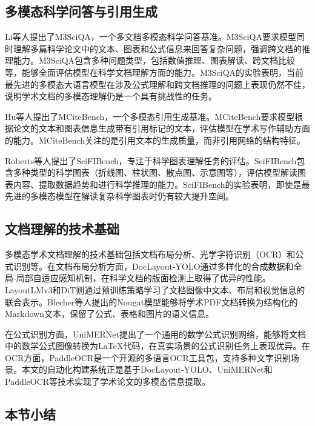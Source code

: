 \subsection{多模态科学问答与引用生成}

Li等人\cite{li2024m3sciqa}提出了M3SciQA，一个多文档多模态科学问答基准。M3SciQA要求模型同时理解多篇科学论文中的文本、图表和公式信息来回答复杂问题，强调跨文档的推理能力。M3SciQA包含多种问题类型，包括数值推理、图表解读、跨文档比较等，能够全面评估模型在科学文档理解方面的能力。M3SciQA的实验表明，当前最先进的多模态大语言模型在涉及公式理解和跨文档推理的问题上表现仍然不佳，说明学术文档的多模态理解仍是一个具有挑战性的任务。

Hu等人\cite{hu2025mcitebench}提出了MCiteBench，一个多模态引用生成基准。MCiteBench要求模型根据论文的文本和图表信息生成带有引用标记的文本，评估模型在学术写作辅助方面的能力。MCiteBench关注的是引用文本的生成质量，而非引用网络的结构特征。

Roberts等人\cite{roberts2024scifibench}提出了SciFIBench，专注于科学图表理解任务的评估。SciFIBench包含多种类型的科学图表（折线图、柱状图、散点图、示意图等），评估模型解读图表内容、提取数据趋势和进行科学推理的能力。SciFIBench的实验表明，即使是最先进的多模态模型在解读复杂科学图表时仍有较大提升空间。

\subsection{文档理解的技术基础}

多模态学术文档理解的技术基础包括文档布局分析、光学字符识别（OCR）和公式识别等。在文档布局分析方面，DocLayout-YOLO\cite{zhao2024doclayoutyolo}通过多样化的合成数据和全局-局部自适应感知机制，在科学文档的版面检测上取得了优异的性能。LayoutLMv3\cite{huang2022layoutlmv3}和DiT\cite{li2022dit}则通过预训练策略学习了文档图像中文本、布局和视觉信息的联合表示。Blecher等人\cite{blecher2024nougat}提出的Nougat模型能够将学术PDF文档转换为结构化的Markdown文本，保留了公式、表格和图片的语义信息。

在公式识别方面，UniMERNet\cite{wang2024unimernet}提出了一个通用的数学公式识别网络，能够将文档中的数学公式图像转换为LaTeX代码，在真实场景的公式识别任务上表现优异。在OCR方面，PaddleOCR\cite{paddleocr}是一个开源的多语言OCR工具包，支持多种文字识别场景。本文的自动化构建系统正是基于DocLayout-YOLO、UniMERNet和PaddleOCR等技术实现了学术论文的多模态信息提取。

\subsection{本节小结}

